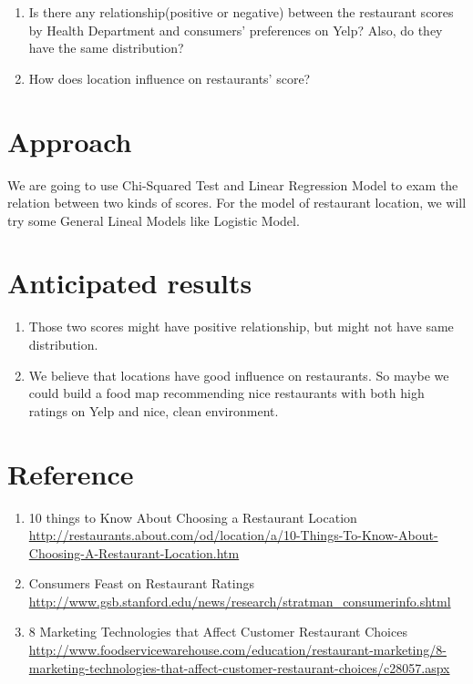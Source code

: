 \documentclass{article}
\begin{document}
\begin{enumerate}
  \item Is there any relationship(positive or negative) between the restaurant scores by Health Department and consumers' preferences on Yelp? Also, do they have  the same distribution?
  \item How does location influence on restaurants' score?
\end{enumerate}

\section{Approach}
We are going to use Chi-Squared Test and Linear Regression Model to exam the relation between two kinds of scores. For the model of restaurant location, we will try some General Lineal Models like Logistic Model.

\section{Anticipated results}
\begin{enumerate}
  \item Those two scores might have positive relationship, but might not have same distribution.
  \item We believe that locations have good influence on restaurants. So maybe we could build a food map recommending nice restaurants with both high ratings on Yelp and nice, clean environment. 

\end{enumerate}



\section{Reference}
\begin{enumerate}
  \item10 things to Know About Choosing a Restaurant Location \url{http://restaurants.about.com/od/location/a/10-Things-To-Know-About-Choosing-A-Restaurant-Location.htm}
  \item Consumers Feast on Restaurant Ratings \url{http://www.gsb.stanford.edu/news/research/stratman_consumerinfo.shtml}
  \item 8 Marketing Technologies that Affect Customer Restaurant Choices \url{http://www.foodservicewarehouse.com/education/restaurant-marketing/8-marketing-technologies-that-affect-customer-restaurant-choices/c28057.aspx}
\end{enumerate}
\end{document}
